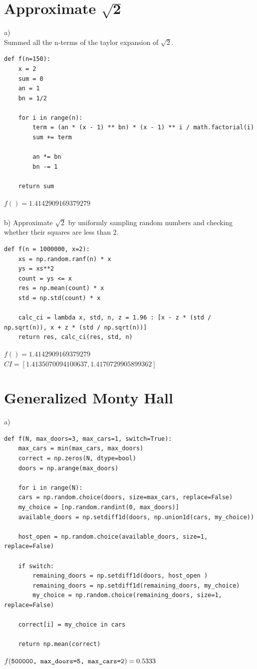 \documentclass[twocolumn]{article}
\begin{document}
\pagebreak


\section{Approximate $\mathbf{\sqrt{2}}$}

a) \\
Summed all the n-terms of the taylor expansion of $\sqrt{2}$.
\\
\begin{lstlisting}
def f(n=150):
	x = 2
	sum = 0
	an = 1
	bn = 1/2
	
	for i in range(n):
		term = (an * (x - 1) ** bn) * (x - 1) ** i / math.factorial(i)
		sum += term
		
		an *= bn
		bn -= 1
	
	return sum
\end{lstlisting}
\vspace{10pt}
\noindent
$f()=1.4142909169379279$
\\
\\


\noindent
b) Approximate $\sqrt{2}$ by uniformly sampling random numbers and checking whether their squares are less than 2.
\\
\begin{lstlisting}
def f(n = 1000000, x=2):
	xs = np.random.ranf(n) * x
	ys = xs**2
	count = ys <= x
	res = np.mean(count) * x
	std = np.std(count) * x
	
	calc_ci = lambda x, std, n, z = 1.96 : [x - z * (std / np.sqrt(n)), x + z * (std / np.sqrt(n))]
	return res, calc_ci(res, std, n)
\end{lstlisting}
\vspace{10pt}
\noindent
$f()=1.4142909169379279$ \\
$CI=[1.4135070094100637, 1.4170729905899362]$

\pagebreak

\section{Generalized Monty Hall}
a)
\begin{lstlisting}
def f(N, max_doors=3, max_cars=1, switch=True):
	max_cars = min(max_cars, max_doors)
	correct = np.zeros(N, dtype=bool)
	doors = np.arange(max_doors)
	
	for i in range(N):
	cars = np.random.choice(doors, size=max_cars, replace=False)
	my_choice = [np.random.randint(0, max_doors)]
	available_doors = np.setdiff1d(doors, np.union1d(cars, my_choice))
	
	host_open = np.random.choice(available_doors, size=1, replace=False)
	
	if switch:
		remaining_doors = np.setdiff1d(doors, host_open )
		remaining_doors = np.setdiff1d(remaining_doors, my_choice)
		my_choice = np.random.choice(remaining_doors, size=1, replace=False)
	
	correct[i] = my_choice in cars
	
	return np.mean(correct)
\end{lstlisting}
\vspace{10pt}
\noindent
$f(\texttt{500000, max\_doors=5, max\_cars=2})\\=0.5333$
\end{document}
